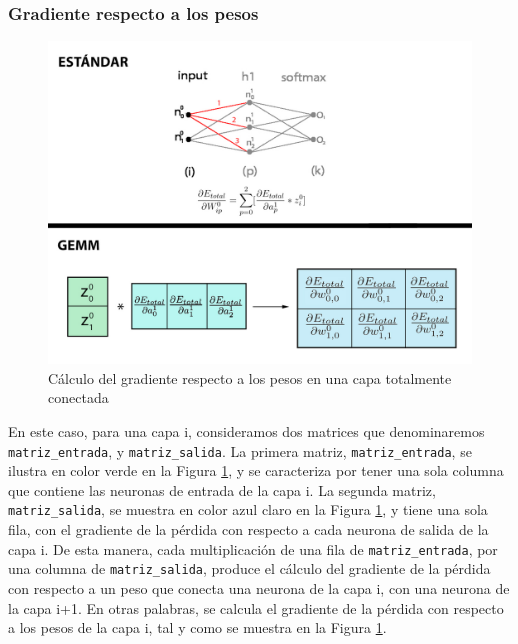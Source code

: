 \subsubsection{Gradiente respecto a los pesos}
\begin{figure}[H]
	\centering
	\includegraphics[scale=0.3]{imagenes/gemm_fully_back_w.jpg}  
	\caption{Cálculo del gradiente respecto a los pesos en una capa totalmente conectada}
	\label{fig:gemm_fully_back_w}
\end{figure}

En este caso, para una capa i, consideramos dos matrices que denominaremos \texttt{matriz\_entrada}, y \texttt{matriz\_salida}. La primera matriz, \texttt{matriz\_entrada}, se ilustra en color verde en la Figura \ref{fig:gemm_fully_back_w}, y se caracteriza por tener una sola columna que contiene las neuronas de entrada de la capa i. La segunda matriz, \texttt{matriz\_salida}, se muestra en color azul claro en la Figura \ref{fig:gemm_fully_back_w}, y tiene una sola fila, con el gradiente de la pérdida con respecto a cada neurona de salida de la capa i. De esta manera, cada multiplicación de una fila de \texttt{matriz\_entrada}, por una columna de \texttt{matriz\_salida}, produce el cálculo del gradiente de la pérdida con respecto a un peso que conecta una neurona de la capa i, con una neurona de la capa i+1. En otras palabras, se calcula el gradiente de la pérdida con respecto a los pesos de la capa i, tal y como se muestra en la Figura \ref{fig:gemm_fully_back_w}.

